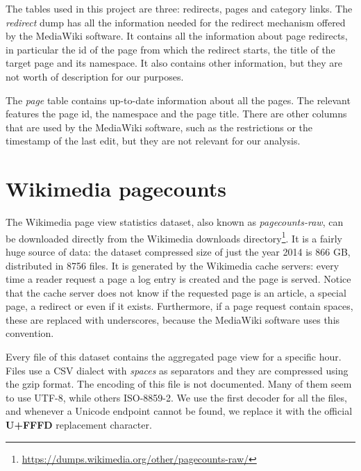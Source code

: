The tables used in this project are three: redirects, pages and category links.
The \emph{redirect} dump has all the information needed for the redirect mechanism offered by the MediaWiki software.
It contains all the information about page redirects, in particular the id of the page from which the redirect starts, the title of the target page and its namespace.
It also contains other information, but they are not worth of description for our purposes.

The \emph{page} table contains up-to-date information about all the pages.
The relevant features the page id, the namespace and the page title.
There are other columns that are used by the MediaWiki software, such as the restrictions or the timestamp of the last edit, but they are not relevant for our analysis.


\section{Wikimedia pagecounts}
The Wikimedia page view statistics dataset, also known as \emph{pagecounts-raw}, can be downloaded directly from the Wikimedia downloads directory\footnote{\url{https://dumps.wikimedia.org/other/pagecounts-raw/}}.
It is a fairly huge source of data: the dataset compressed size of just the year 2014 is 866 GB, distributed in 8756 files.
It is generated by the Wikimedia cache servers: every time a reader request a page a log entry is created and the page is served.
Notice that the cache server does not know if the requested page is an article, a special page, a redirect or even if it exists.
Furthermore, if a page request contain spaces, these are replaced with underscores, because the MediaWiki software uses this convention.

Every file of this dataset contains the aggregated page view for a specific hour.
Files use a CSV dialect with \emph{spaces} as separators and they are compressed using the gzip format.
The encoding of this file is not documented.
Many of them seem to use UTF-8, while others ISO-8859-2. %
We use the first decoder for all the files, and whenever a Unicode endpoint cannot be found, we replace it with the official \textbf{U+FFFD} replacement character.

